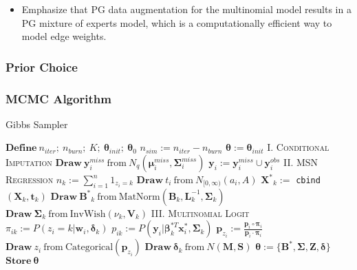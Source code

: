 \documentclass{article}
\begin{document}
\begin{itemize}

\item Emphasize that PG data augmentation for the multinomial model results in a PG mixture of experts model, which is a computationally efficient way to model edge weights. 

\end{itemize}

\subsubsection{Prior Choice}

\subsubsection{MCMC Algorithm}

\begin{algorithm}
\caption{Gibbs Sampler}
\begin{algorithmic}
\small
\linespread{0.5}
    \State $\mathbf{Define} \ n_{iter};\  n_{burn}; \ K; \ \boldsymbol\theta_{init}; \ \boldsymbol\theta_0$
    \State $n_{sim} := n_{iter} - n_{burn}$
    \State $\boldsymbol\theta := \boldsymbol\theta_{init}$
        \State \textsc{I. Conditional Imputation}
            \State $\mathbf{Draw} \ \mathbf{y}_i^{miss} \ \text{from} \ N_q(\boldsymbol\mu_i^{miss}, \boldsymbol\Sigma_i^{miss})$
            \State $\mathbf{y}_i := \mathbf{y}_i^{miss} \cup \mathbf{y}_i^{obs}$
         \EndFor
        \State \textsc{II. MSN Regression}
            \State $n_k := \sum_{i = 1}^n {1}_{z_i = k}$
              \State $\mathbf{Draw}\  t_i \ \text{from} \ N_{[0,\infty)}(a_i,A)$
            \EndFor
            \State $\mathbf{X^*}_k := $ \texttt{cbind}$(\mathbf{X}_k,\mathbf{t}_k)$
            \State $\mathbf{Draw} \ \mathbf{B^*}_k \ \text{from} \ \text{MatNorm}(\mathbf{B}_k,\mathbf{L}_k^{-1},\boldsymbol\Sigma_k)$
            \State $\mathbf{Draw} \ \boldsymbol\Sigma_k \ \text{from} \ \text{InvWish}(\nu_k, \mathbf{V}_k)$
          \EndFor
        \State \textsc{III. Multinomial Logit}
              \State $\pi_{ik} := P(z_i = k|\mathbf{w}_i,\boldsymbol\delta_k)$
              \State $p_{ik} := P(\mathbf{y}_i|\boldsymbol\beta_k^{*T} \mathbf{x}^*_i,\boldsymbol\Sigma_k)$
            \EndFor
            \State $\mathbf{p}_{z_i} := \frac{\mathbf{p}_i \circ \boldsymbol\pi_i}{\mathbf{p}_i \cdot \boldsymbol\pi_i}$
            \State $\mathbf{Draw} \ z_i \ \text{from} \ \text{Categorical}(\mathbf{p}_{z_i})$
              \State $\mathbf{Draw} \ \boldsymbol\delta_k \ \text{from} \ N(\mathbf{M},\mathbf{S})$
            \EndFor
          \EndFor
        \State $\boldsymbol\theta := \{\mathbf{B^*}, \boldsymbol\Sigma, \mathbf{Z}, \boldsymbol\delta \}$
        \State $\mathbf{Store} \ \boldsymbol\theta$
	  \EndFor
\end{algorithmic}
\end{algorithm}
\end{document}
